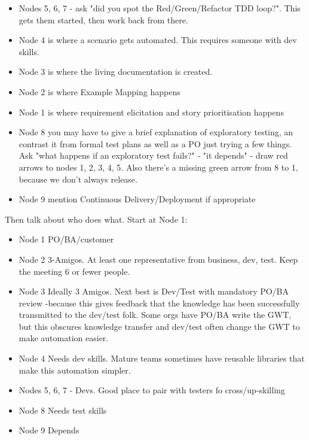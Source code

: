     \begin{itemize}
        \item Nodes 5, 6, 7 - ask "did you spot the Red/Green/Refactor TDD loop?". This gets them started, then work back from there. 
        \item Node 4 is where a scenario gets automated. This requires someone with dev skills.
        \item Node 3 is where the living documentation is created.
        \item Node 2 is where Example Mapping happens
        \item Node 1 is where requirement elicitation and story prioritisation happens
        \item Node 8 you may have to give a brief explanation of exploratory testing, an contrast it from formal test plans as well as a PO just trying a few things. Ask "what happens if an exploratory test fails?" - "it depends" - draw red arrows to nodes 1, 2, 3, 4, 5. Also there's a missing green arrow from 8 to 1, because we don't always release.
        \item Node 9 mention Continuous Delivery/Deployment if appropriate
    \end{itemize}
    
    Then talk about who does what. Start at Node 1:
    
    \begin{itemize}
        \item Node 1 PO/BA/customer        
        \item Node 2 3-Amigos. At least one representative from business, dev, test. Keep the meeting 6 or fewer people. 
        \item Node 3 Ideally 3 Amigos. Next best is Dev/Test with mandatory PO/BA review -because this gives feedback that the knowledge has been successfully transmitted to the dev/test folk. Some orgs have PO/BA write the GWT, but this obscures knowledge transfer and dev/test often change the GWT to make automation easier.
        \item Node 4 Needs dev skills. Mature teams sometimes have reusable libraries that make this automation simpler.
        \item Nodes 5, 6, 7 - Devs. Good place to pair with testers fo cross/up-skilling        
        \item Node 8 Needs test skills
        \item Node 9 Depends
    \end{itemize}
    
